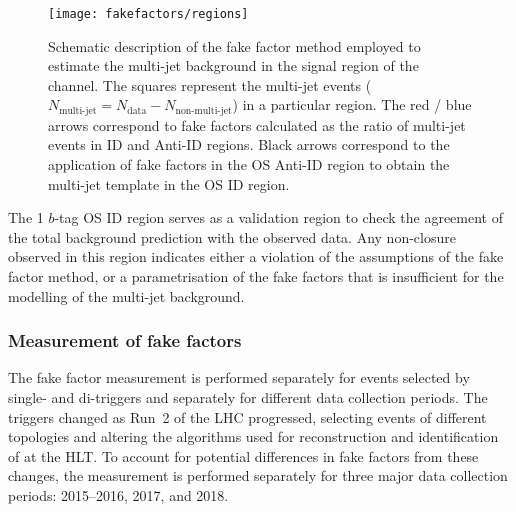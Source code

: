 \begin{figure}[htbp]
  \centering

  \texttt{[image: fakefactors/regions]}

  \caption{Schematic description of the fake factor method employed to
    estimate the multi-jet background in the signal region of the
    \hadhad channel. The squares represent the multi-jet events
    ($N_\text{multi-jet} = N_\text{data} - N_\text{non-multi-jet}$) in
    a particular region. The red / blue arrows correspond to fake
    factors calculated as the ratio of multi-jet events in ID and
    Anti-ID regions. Black arrows correspond to the application of
    fake factors in the OS Anti-ID region to obtain the multi-jet
    template in the OS ID region.}
  \label{fig:fakefactor_regions}
\end{figure}

The 1 $b$-tag OS ID region serves as a validation region to check the
agreement of the total background prediction with the observed
data. Any non-closure observed in this region indicates either a
violation of the assumptions of the fake factor method, or a
parametrisation of the fake factors that is insufficient for the
modelling of the multi-jet background.



\subsubsection{Measurement of fake factors}

The fake factor measurement is performed separately for events
selected by single- and di-\tauhadvis triggers and separately for
different data collection periods. The \tauhadvis triggers changed as
Run~2 of the LHC progressed, selecting events of different topologies
and altering the algorithms used for reconstruction and identification
of \tauhadvis at the HLT. To account for potential differences in fake
factors from these changes, the measurement is performed separately
for three major data collection periods: 2015--2016, 2017, and 2018.

